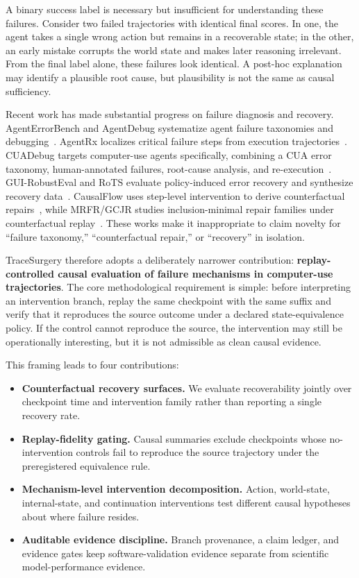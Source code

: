 \documentclass{article}
\begin{document}
A binary success label is necessary but insufficient for understanding these failures. Consider two failed trajectories with identical final scores. In one, the agent takes a single wrong action but remains in a recoverable state; in the other, an early mistake corrupts the world state and makes later reasoning irrelevant. From the final label alone, these failures look identical. A post-hoc explanation may identify a plausible root cause, but plausibility is not the same as causal sufficiency.

Recent work has made substantial progress on failure diagnosis and recovery. AgentErrorBench and AgentDebug systematize agent failure taxonomies and debugging~\citep{zhu2025agentdebug}. AgentRx localizes critical failure steps from execution trajectories~\citep{barke2026agentrx}. CUADebug targets computer-use agents specifically, combining a CUA error taxonomy, human-annotated failures, root-cause analysis, and re-execution~\citep{zhang2026cuadebug}. GUI-RobustEval and RoTS evaluate policy-induced error recovery and synthesize recovery data~\citep{bu2026rots}. CausalFlow uses step-level intervention to derive counterfactual repairs~\citep{bonagiri2026causalflow}, while MRFR/GCJR studies inclusion-minimal repair families under counterfactual replay~\citep{li2026mrfr}. These works make it inappropriate to claim novelty for ``failure taxonomy,'' ``counterfactual repair,'' or ``recovery'' in isolation.

TraceSurgery therefore adopts a deliberately narrower contribution: \textbf{replay-controlled causal evaluation of failure mechanisms in computer-use trajectories}. The core methodological requirement is simple: before interpreting an intervention branch, replay the same checkpoint with the same suffix and verify that it reproduces the source outcome under a declared state-equivalence policy. If the control cannot reproduce the source, the intervention may still be operationally interesting, but it is not admissible as clean causal evidence.

This framing leads to four contributions:
\begin{itemize}
  \item \textbf{Counterfactual recovery surfaces.} We evaluate recoverability jointly over checkpoint time and intervention family rather than reporting a single recovery rate.
  \item \textbf{Replay-fidelity gating.} Causal summaries exclude checkpoints whose no-intervention controls fail to reproduce the source trajectory under the preregistered equivalence rule.
  \item \textbf{Mechanism-level intervention decomposition.} Action, world-state, internal-state, and continuation interventions test different causal hypotheses about where failure resides.
  \item \textbf{Auditable evidence discipline.} Branch provenance, a claim ledger, and evidence gates keep software-validation evidence separate from scientific model-performance evidence.
\end{itemize}
\end{document}

